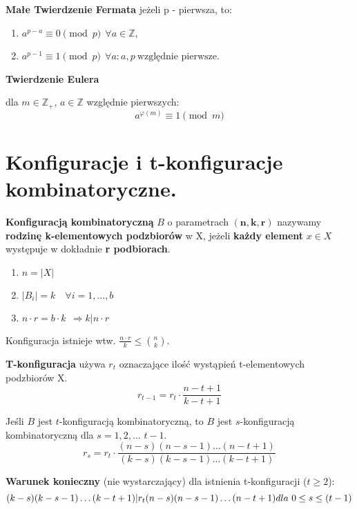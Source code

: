\documentclass[main.tex]{subfiles}
\begin{document}
    \begin{definition}
        \textbf{Małe Twierdzenie Fermata}
        jeżeli p - pierwsza, to:

        \begin{enumerate}
            \item $a^{p-a} \equiv 0 \pmod p ~~ \forall a \in \mathbb{Z}$,
            \item $a^{p-1} \equiv 1 \pmod p ~~ \forall a : a, p ~ \text{względnie pierwsze}$.
        \end{enumerate}
    \end{definition}

    \begin{definition}
        \textbf{Twierdzenie Eulera}

        dla $m \in \mathbb{Z_{+}}$, $a \in \mathbb{Z}$ względnie pierwszych:
        \[ a^{\varphi (m)} \equiv 1 \pmod m \]
    \end{definition}


    \section{Konfiguracje i t-konfiguracje kombinatoryczne.}

    \begin{definition}
        \textbf{Konfiguracją kombinatoryczną} $B$ o parametrach $\mathbf{(n,k,r)}$ nazywamy \textbf{rodzinę k-elementowych
        podzbiorów} w X, jeżeli \textbf{każdy element} $x \in X$ występuje w dokładnie \textbf{r podbiorach}.
        \begin{enumerate}
            \item $n = |X|$
            \item $|B_i|=k \quad \forall i=1, \dots, b$
            \item $n \cdot r = b \cdot k ~~ \Rightarrow k | n\cdot r$
        \end{enumerate}
        Konfiguracja istnieje wtw. $\frac{n\cdot r}{k}\leq {n\choose k}$.


    \end{definition}

    \begin{definition}
        \textbf{T-konfiguracja} używa $r_t$ oznaczające ilość wystąpień t-elementowych podzbiorów X.
        \[r_{t-1} = r_t \cdot \frac{n-t+1}{k-t+1}\]

        Jeśli $B$ jest $t$-konfiguracją kombinatoryczną, to
        $B$ jest $s$-konfiguracją kombinatoryczną dla $s = 1, 2,\dots$ $t-1$.
        \[r_s = r_t \cdot \frac{(n-s)(n-s-1)\dots(n-t+1)}{(k-s)(k-s-1)\dots(k-t+1)}\]

        \textbf{Warunek konieczny} (nie wystarczający) dla istnienia t-konfiguracji ($t \geq 2$):
        \[(k-s)(k-s-1)\dots(k-t+1)|r_t(n-s)(n-s-1)\dots(n-t+1) \\ dla\  0\leq s \leq (t-1)\]
    \end{definition}
\end{document}
